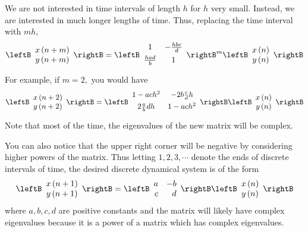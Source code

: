 We are not interested in time intervals of length $h$ for $h$ very small.
Instead, we are interested in much longer lengths of time. Thus, replacing
the time interval with $mh,$
\begin{equation*}
\leftB
\begin{array}{c}
x\left( n+m\right) \\
y\left( n+m\right)
\end{array}
\rightB =\leftB
\begin{array}{cc}
1 & -\vspace{0.05in}\frac{hbc}{d} \\
\vspace{0.05in}\frac{had}{b} & 1
\end{array}
\rightB ^{m}\leftB
\begin{array}{c}
x\left( n\right) \\
y\left( n\right)
\end{array}
\rightB
\end{equation*}
For example, if $m=2,$ you would have
\begin{equation*}
\leftB
\begin{array}{c}
x\left( n+2\right) \\
y\left( n+2\right)
\end{array}
\rightB =\leftB
\begin{array}{cc}
1-ach^{2} & -2b\vspace{0.05in}\frac{c}{d}h \\
2\vspace{0.05in}\frac{a}{b}dh & 1-ach^{2}
\end{array}
\rightB \leftB
\begin{array}{c}
x\left( n\right) \\
y\left( n\right)
\end{array}
\rightB
\end{equation*}
Note that most of the time, the eigenvalues of the new matrix will be complex.

You can also notice that the upper right corner will be negative by
considering higher powers of the matrix. Thus letting $1,2,3,\cdots $ denote
the ends of discrete intervals of time, the desired discrete dynamical
system is of the form
\begin{equation*}
\leftB
\begin{array}{c}
x\left( n+1\right) \\
y\left( n+1\right)
\end{array}
\rightB =\leftB
\begin{array}{rr}
a & -b \\
c & d
\end{array}
\rightB \leftB
\begin{array}{c}
x\left( n\right) \\
y\left( n\right)
\end{array}
\rightB
\end{equation*}
where $a,b,c,d$ are positive constants and the matrix will likely have
complex eigenvalues because it is a power of a matrix which has complex
eigenvalues.

